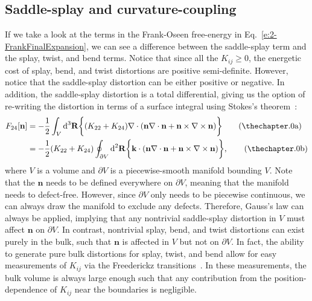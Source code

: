 \subsection{Saddle-splay and curvature-coupling}
If we take a look at the terms in the Frank-Oseen free-energy in Eq.~\ref{e:2-FrankFinalExpansion}, we can see a difference between the saddle-splay term and the splay, twist, and bend terms.
Notice that since all the $K_{ij} \geq 0$, the energetic cost of splay, bend, and twist distortions are positive semi-definite.
However, notice that the saddle-splay distortion can be either positive or negative.
In addition, the saddle-splay distortion is a total differential, giving us the option of re-writing the distortion in terms of a surface integral using Stokes's theorem~:
\label{e:2-F24Gauss}
\begin{align}
  F_{24}[\mathbf{n}] &= - \frac{1}{2}\int_{V} \textup{d}^3  \mathbf{R} \bigg \{ (K_{22} + K_{24})  \nabla \cdot (\mathbf{n}\nabla \cdot \mathbf{n} + \mathbf{n} \times \nabla \times \mathbf{n}) \bigg \}\tag{\theequation a}  \\ &=
  - \frac{1}{2}(K_{22} + K_{24}) \oint_{\partial V} \textup{d}^2  \mathbf{R} \bigg \{   \mathbf{k} \cdot (\mathbf{n}\nabla \cdot \mathbf{n} + \mathbf{n} \times \nabla \times \mathbf{n}) \bigg \},\tag{\theequation b}
\end{align}
where $V$ is a volume and $\partial V$ is a piecewise-smooth manifold bounding $V$.
Note that the $\mathbf{n}$ needs to be defined everywhere on $\partial V$, meaning that the manifold needs to defect-free.
However, since $\partial V$ only needs to be piecewise continuous, we can always draw the manifold to exclude any defects.
Therefore, Gauss's law can always be applied, implying that any nontrivial saddle-splay distortion in $V$ must affect $\mathbf{n}$ on $\partial V$.
In contrast, nontrivial splay, bend, and twist distortions can exist purely in the bulk, such that $\mathbf{n}$ is affected in $V$ but not on $\partial V$.
In fact, the ability to generate pure bulk distortions for splay, twist, and bend allow for easy measurements of $K_{ij}$ via the Freederickz transitions~\cite{RN33,RN188,RN182,RN183}.
In these measurements, the bulk volume is always large enough such that any contribution from the position-dependence of $K_{ij}$ near the boundaries is negligible. \\

